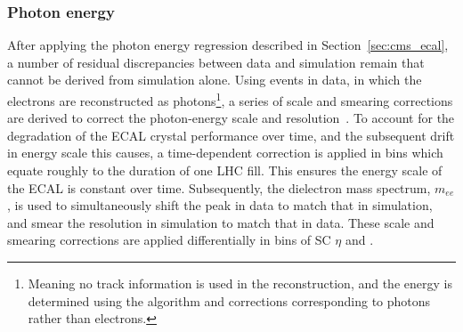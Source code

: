 \subsubsection{Photon energy}


After applying the photon energy regression described in Section~\ref{sec:cms_ecal}, a number of residual discrepancies between data and simulation remain that cannot be derived from simulation alone. Using \Zee events in data, in which the electrons are reconstructed as photons\footnote{Meaning no track information is used in the reconstruction, and the energy is determined using the algorithm and corrections corresponding to photons rather than electrons.}, a series of scale and smearing corrections are derived to correct the photon-energy scale and resolution~\cite{Sirunyan:2020xwk}. To account for the degradation of the ECAL crystal performance over time, and the subsequent drift in energy scale this causes, a time-dependent correction is applied in bins which equate roughly to the duration of one LHC fill. This ensures the energy scale of the ECAL is constant over time. Subsequently, the dielectron mass spectrum, $m_{ee}$, is used to simultaneously shift the peak in data to match that in simulation, and smear the resolution in simulation to match that in data. These scale and smearing corrections are applied differentially in bins of SC $\eta$ and \RNINE. 

